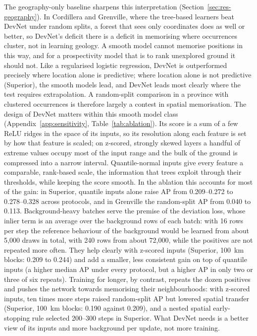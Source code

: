 \documentclass[pdflatex,sn-apa]{sn-jnl}
\begin{document}
The geography-only baseline sharpens this interpretation (Section~\ref{sec:res-geography}). In Cordillera and Grenville, where the tree-based learners beat DevNet under random splits, a forest that sees only coordinates does as well or better, so DevNet's deficit there is a deficit in memorising where occurrences cluster, not in learning geology. A smooth model cannot memorise positions in this way, and for a prospectivity model that is to rank unexplored ground it should not. Like a regularised logistic regression, DevNet is outperformed precisely where location alone is predictive; where location alone is not predictive (Superior), the smooth models lead, and DevNet leads most clearly where the test requires extrapolation. A random-split comparison in a province with clustered occurrences is therefore largely a contest in spatial memorisation. The design of DevNet matters within this smooth model class (Appendix~\ref{app:sensitivity}, Table~\ref{tab:ablation}). Its score is a sum of a few ReLU ridges in the space of its inputs, so its resolution along each feature is set by how that feature is scaled; on z-scored, strongly skewed layers a handful of extreme values occupy most of the input range and the bulk of the ground is compressed into a narrow interval. Quantile-normal inputs give every feature a comparable, rank-based scale, the information that trees exploit through their thresholds, while keeping the score smooth. In the ablation this accounts for most of the gain: in Superior, quantile inputs alone raise AP from 0.209--0.272 to 0.278--0.328 across protocols, and in Grenville the random-split AP from 0.040 to 0.113. Background-heavy batches serve the premise of the deviation loss, whose inlier term is an average over the background rows of each batch: with 16 rows per step the reference behaviour of the background would be learned from about 5,000 draws in total, with 240 rows from about 72,000, while the positives are not repeated more often. They help clearly with z-scored inputs (Superior, 100~km blocks: 0.209 to 0.244) and add a smaller, less consistent gain on top of quantile inputs (a higher median AP under every protocol, but a higher AP in only two or three of six repeats). Training for longer, by contrast, repeats the dozen positives and pushes the network towards memorising their neighbourhoods: with z-scored inputs, ten times more steps raised random-split AP but lowered spatial transfer (Superior, 100~km blocks: 0.190 against 0.209), and a nested spatial early-stopping rule selected 200--300 steps in Superior. What DevNet needs is a better view of its inputs and more background per update, not more training.
\end{document}
